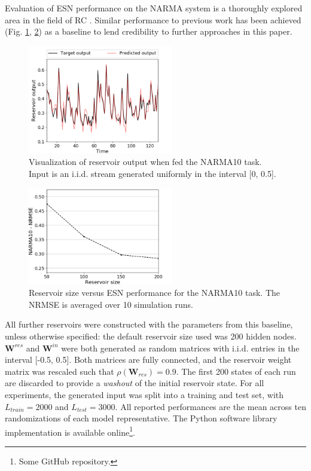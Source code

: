 Evaluation of ESN performance on the NARMA system is a thoroughly explored area
in the field of RC \cite{verstraeten_experimental_2007, rodan_minimum_2011,
jaeger_adaptive_nodate}. Similar performance to previous work has been achieved
(Fig. \ref{visualization}, \ref{performance}) as a baseline to lend credibility
to further approaches in this paper.

\begin{figure}[H]
  \centering
  \includegraphics[width=2.5in]{img/narma_visualization.png}
  \caption{
    Visualization of reservoir output when fed the NARMA10 task. Input is an
i.i.d. stream generated uniformly in the interval [0, 0.5].
  }
  \label{visualization}
\end{figure}

\begin{figure}[H]
  \centering
  \includegraphics[width=2.5in]{img/general_performance.png}
  \caption{
    Reservoir size versus ESN performance for the NARMA10 task. The NRMSE is
averaged over 10 simulation runs.
  }
  \label{performance}
\end{figure}

All further reservoirs were constructed with the parameters from this baseline,
unless otherwise specified: the default reservoir size used was 200 hidden
nodes. $\mathbf{W}^{res}$ and $\mathbf{W}^{in}$ were both generated as random
matrices with i.i.d. entries in the interval [-0.5, 0.5]. Both matrices are
fully connected, and the reservoir weight matrix was rescaled such that
$\rho(\mathbf{W}_{res}) = 0.9$. The first 200 states of each run are discarded
to provide a \textit{washout} of the initial reservoir state. For all
experiments, the generated input was split into a training and test set, with
$L_{train} = 2000$ and $L_{test} = 3000$. All reported performances are the mean
across ten randomizations of each model representative. The Python software
library implementation is available online\footnote{Some GitHub repository.}.

